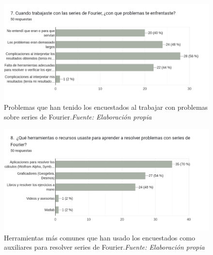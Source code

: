 \begin{figure}[H]
	\centering
	\includegraphics[width=1\textwidth]{img/appendixA/7_problemas_Fourier.png}
	\caption[Problemas que han tenido los encuestados al trabajar con problemas sobre series de Fourier.]{Problemas que han tenido los encuestados al trabajar con problemas sobre series de Fourier.\textit{Fuente: Elaboración propia}}
	\label{fig:app1_problemas_Fourier}  %
\end{figure}

\begin{figure}[H]
	\centering
	\includegraphics[width=1\textwidth]{img/appendixA/8_herramientas_para_Fourier.png}
	\caption[Herramientas más comunes que han usado los encuestados como auxiliares para resolver series de Fourier.]{Herramientas más comunes que han usado los encuestados como auxiliares para resolver series de Fourier.\textit{Fuente: Elaboración propia}}
	\label{fig:app1_herramientas_para_Fourier}  %
\end{figure}

